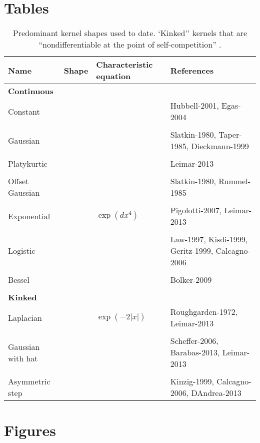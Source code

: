 \documentclass[a4paper,11pt]{article}
\begin{document}
\section{Tables}


\begin{table}[h]
 \caption{Predominant kernel shapes used to date. 
`Kinked'' kernels that are ``nondifferentiable at the point of
self-competition'' \citep{Barabas-2012}.}
\centering
{\footnotesize
  \begin{tabular}{p{3cm}p{4cm}p{3cm}p{4cm}}
  \hline
  Name & Shape & Characteristic equation & References \\
  \hline
  \multicolumn{4}{l}{\textbf{Continuous}} \\
  Constant & & & Hubbell-2001, Egas-2004 \\ \\
  Gaussian & & & Slatkin-1980, Taper-1985,
  Dieckmann-1999\\ \\
  Platykurtic & & &  Leimar-2013 \\ \\
  Offset Gaussian & & & Slatkin-1980, Rummel-1985\\ \\
  Exponential & & $\exp(dx^4)$ &Pigolotti-2007, Leimar-2013\\ \\
  Logistic & & & Law-1997, Kisdi-1999, Geritz-1999, Calcagno-2006\\ \\
  Bessel & & & Bolker-2009\\ \\
 \multicolumn{4}{l}{\textbf{Kinked}} \\
  Laplacian & & $\exp(-2|x|)$ & Roughgarden-1972, Leimar-2013 \\ \\
  Gaussian with hat & & & Scheffer-2006, Barabas-2013, Leimar-2013 \\ \\
  Asymmetric step & & & Kinzig-1999, Calcagno-2006, DAndrea-2013 \\
  \hline
  \end{tabular}
}
\label{tab:shapes}
\end{table}

\clearpage

\section{Figures}
\end{document}
